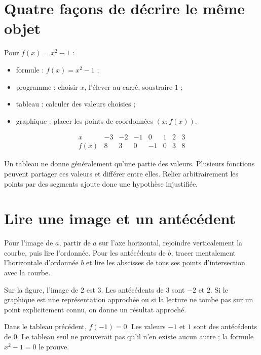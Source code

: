 \documentclass[../cours_3e.tex]{subfiles}
\begin{document}
\section{Quatre façons de décrire le même objet}
Pour $f(x)=x^2-1$ :
\begin{itemize}
\item formule : $f(x)=x^2-1$ ;
\item programme : choisir $x$, l'élever au carré, soustraire $1$ ;
\item tableau : calculer des valeurs choisies ;
\item graphique : placer les points de coordonnées $(x;f(x))$.
\end{itemize}
\[
\begin{array}{c|rrrrrrr}
x&-3&-2&-1&0&1&2&3\\\hline
f(x)&8&3&0&-1&0&3&8
\end{array}
\]
\begin{center}
\end{center}
Un tableau ne donne généralement qu'une partie des valeurs. Plusieurs fonctions peuvent partager ces valeurs et différer entre elles. Relier arbitrairement les points par des segments ajoute donc une hypothèse injustifiée.
\section{Lire une image et un antécédent}
\begin{methode}
Pour l'image de $a$, partir de $a$ sur l'axe horizontal, rejoindre verticalement la courbe, puis lire l'ordonnée. Pour les antécédents de $b$, tracer mentalement l'horizontale d'ordonnée $b$ et lire les abscisses de tous ses points d'intersection avec la courbe.
\end{methode}
Sur la figure, l'image de $2$ est $3$. Les antécédents de $3$ sont $-2$ et $2$. Si le graphique est une représentation approchée ou si la lecture ne tombe pas sur un point explicitement connu, on donne un résultat approché.
\begin{exemple}
Dans le tableau précédent, $f(-1)=0$. Les valeurs $-1$ et $1$ sont des antécédents de $0$. Le tableau seul ne prouverait pas qu'il n'en existe aucun autre ; la formule $x^2-1=0$ le prouve.
\end{exemple}
\end{document}
